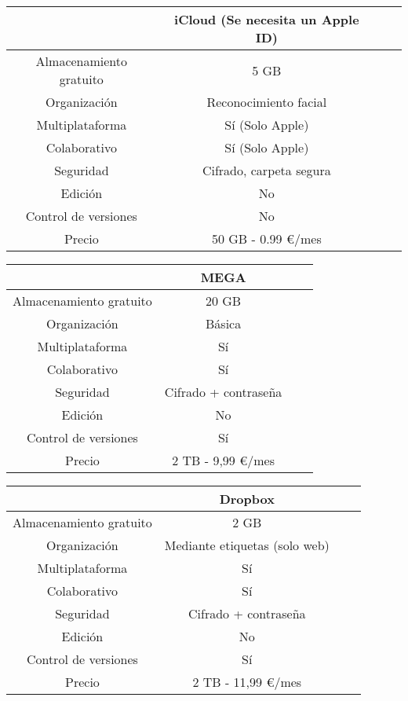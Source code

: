 \vspace{1cm} %

\begin{tabular}{| c | c | c | c |}
    \hline
    \cellcolor[HTML]{000000} & iCloud (Se necesita un Apple ID)\\ 
    \hline
    Almacenamiento gratuito & 5 GB \\
    \hline
    Organización & Reconocimiento facial \\
    \hline
    Multiplataforma & Sí (Solo Apple) \\
    \hline
    Colaborativo & Sí (Solo Apple) \\
    \hline
    Seguridad & Cifrado, carpeta segura \\
    \hline
    Edición & No \\
    \hline
    Control de versiones & No \\
    \hline
    Precio & 50 GB - 0.99 €/mes \\
    \hline
\end{tabular}

\vspace{1cm} %

\begin{tabular}{| c | c | c | c |}
    \hline
        \cellcolor[HTML]{dd1405} & MEGA\\ 
    \hline
    Almacenamiento gratuito & 20 GB \\
    \hline
    Organización & Básica \\
    \hline
    Multiplataforma & Sí \\
    \hline
    Colaborativo & Sí \\
    \hline
    Seguridad & Cifrado + contraseña \\
    \hline
    Edición & No \\
    \hline
    Control de versiones & Sí \\
    \hline
    Precio & 2 TB - 9,99 €/mes \\
    \hline
\end{tabular}

\vspace{1cm} %

\begin{tabular}{| c | c | c | c |}
    \hline
        \cellcolor[HTML]{0061fe} & Dropbox\\ 
    \hline
    Almacenamiento gratuito & 2 GB \\
    \hline
    Organización & Mediante etiquetas (solo web) \\
    \hline
    Multiplataforma & Sí \\
    \hline
    Colaborativo & Sí \\
    \hline
    Seguridad & Cifrado + contraseña \\
    \hline
    Edición & No \\
    \hline
    Control de versiones & Sí \\
    \hline
    Precio & 2 TB - 11,99 €/mes \\
    \hline
\end{tabular}

